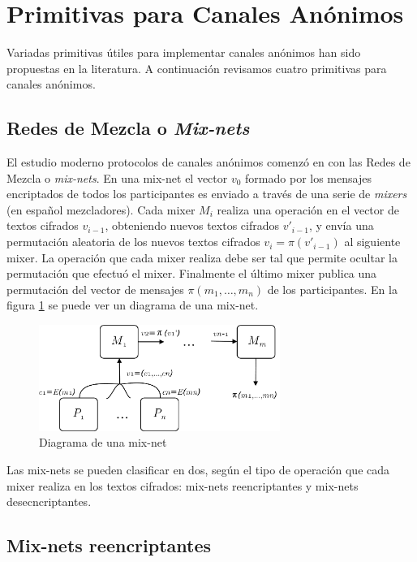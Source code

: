 \section{Primitivas para Canales Anónimos}

Variadas primitivas útiles para implementar canales anónimos han sido propuestas en la literatura. A continuación
revisamos cuatro primitivas para canales anónimos.

\subsection{Redes de Mezcla o \textit{Mix-nets}}
El estudio moderno protocolos de canales anónimos comenzó en \cite{journals/cacm/Chaum81} con las Redes
de Mezcla o \textit{mix-nets}. En una mix-net el vector $v_0$ formado por los mensajes encriptados de todos
los participantes es enviado a través de una serie de \textit{mixers} (en español mezcladores). Cada
mixer $M_i$ realiza una operación en el vector de textos cifrados $v_{i-1}$, obteniendo nuevos textos cifrados
$v'_{i-1}$, y envía una
permutación aleatoria de los nuevos textos cifrados $v_i = \pi(v'_{i-1})$ al siguiente mixer.
La operación que cada mixer realiza debe ser tal que permite ocultar la permutación que efectuó el mixer.
Finalmente el último mixer publica una permutación del vector de mensajes $\pi(m_1, \ldots, m_n)$ de los
participantes. En la figura \ref{fig:mix-net} se puede ver un diagrama de una mix-net.\\

\begin{figure}[hp]
    \centering
    \includegraphics[width=0.7\textwidth]{figs/mixnet}
    \caption{Diagrama de una mix-net}
    \label{fig:mix-net}
\end{figure}


Las mix-nets se pueden clasificar en dos, según el tipo de operación que cada mixer realiza en los textos
cifrados: mix-nets reencriptantes y mix-nets desecncriptantes.

\subsection{Mix-nets reencriptantes}

